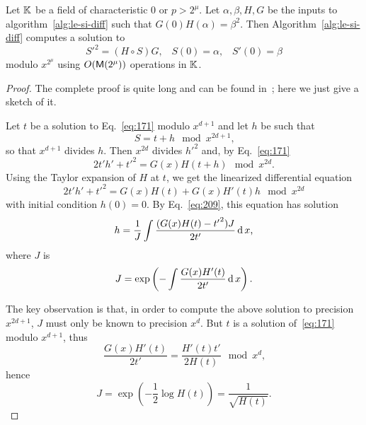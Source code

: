 \begin{theorem}
  Let $\mathbb{K}$ be a field of characteristic $0$ or $p>2^\mu$. Let
  $\alpha,\beta,H,G$ be the inputs to algorithm~\ref{alg:le-si-diff}
  such that $G(0)H(\alpha)=\beta^2$. Then
  Algorithm~\ref{alg:le-si-diff} computes a solution to
  \begin{equation}
    \label{eq:171}
    {S'}^2 = (H\circ S)G
    \text{,}\quad
    S(0) = \alpha
    \text{,}\quad
    S'(0) = \beta
  \end{equation}
  modulo $x^{2^\mu}$ using $O(\mathsf{M}(2^{\mu}))$ operations in $\mathbb{K}$.
\end{theorem}
\begin{proof}
  The complete proof is quite long and can be found
  in~\cite{lercier+sirvent08}; here we just give a sketch of it.

  Let $t$ be a solution to Eq.~\eqref{eq:171} modulo $x^{d+1}$ and let
  $h$ be such that 
  \begin{equation}
    \label{eq:175}
    S = t + h \mod x^{2d+1}
    \text{,}
  \end{equation}
  so that $x^{d+1}$ divides $h$.  Then $x^{2d}$ divides ${h'}^2$ and,
  by Eq.~\eqref{eq:171}
  \begin{equation}
    \label{eq:176}
    2t'h' + {t'}^2 = G(x)H(t+h) \mod x^{2d}
    \text{.}
  \end{equation}
  Using the Taylor expansion of $H$ at $t$, we get the linearized
  differential equation
  \begin{equation}
    \label{eq:177}
    2t'h' + {t'}^2 = G(x)H(t) + G(x)H'(t)h
    \mod x^{2d}
  \end{equation}
  with initial condition $h(0)=0$. By Eq.~\eqref{eq:209}, this
  equation has solution
  \begin{equation}
    \label{eq:178}
    h = \frac{1}{J} \int \frac{(G(x)H(t) - {t'}^2)J}{2t'}\operatorname{d} x
    \text{,}
  \end{equation}
  where $J$ is 
  \begin{equation}
    \label{eq:179}
    J=\exp\left(-\int\frac{G(x)H'(t)}{2t'}\operatorname{d} x\right)
    \text{.}
  \end{equation}

  The key observation is that, in order to compute the above solution
  to precision $x^{2d+1}$, $J$ must only be known to precision
  $x^d$. But $t$ is a solution of~\eqref{eq:171} modulo $x^{d+1}$, thus 
  \begin{equation}
    \label{eq:172}
    \frac{G(x)H'(t)}{2t'} = \frac{H'(t)t'}{2H(t)} \mod x^d
    \text{,}
  \end{equation}
  hence
  \begin{equation}
    \label{eq:173}
    J = \exp\left(-\frac{1}{2}\log H(t)\right) = \frac{1}{\sqrt{H(t)}}
    \text{.}
  \end{equation}


\end{proof}
